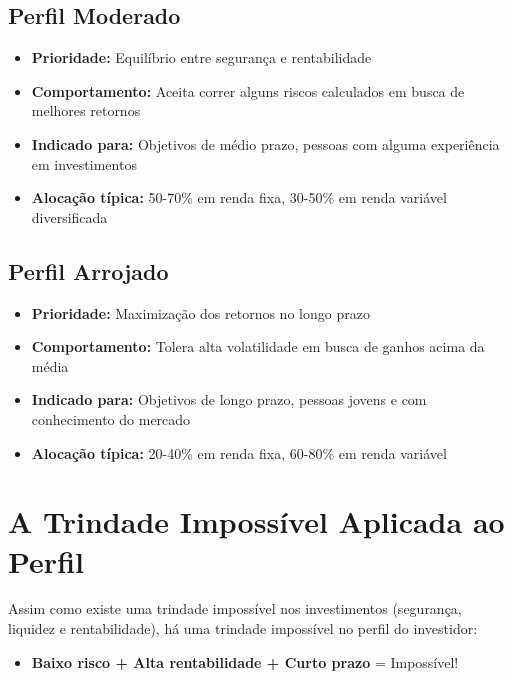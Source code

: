 \subsection{Perfil Moderado}
\begin{itemize}[leftmargin=*]
    \item \textbf{Prioridade:} Equilíbrio entre segurança e rentabilidade
    \item \textbf{Comportamento:} Aceita correr alguns riscos calculados em busca de melhores retornos
    \item \textbf{Indicado para:} Objetivos de médio prazo, pessoas com alguma experiência em investimentos
    \item \textbf{Alocação típica:} 50-70\% em renda fixa, 30-50\% em renda variável diversificada
\end{itemize}

\subsection{Perfil Arrojado}
\begin{itemize}[leftmargin=*]
    \item \textbf{Prioridade:} Maximização dos retornos no longo prazo
    \item \textbf{Comportamento:} Tolera alta volatilidade em busca de ganhos acima da média
    \item \textbf{Indicado para:} Objetivos de longo prazo, pessoas jovens e com conhecimento do mercado
    \item \textbf{Alocação típica:} 20-40\% em renda fixa, 60-80\% em renda variável
\end{itemize}

\section{A Trindade Impossível Aplicada ao Perfil}

\noindent Assim como existe uma trindade impossível nos investimentos (segurança, liquidez e rentabilidade), há uma trindade impossível no perfil do investidor:

\begin{itemize}[leftmargin=*]
    \item \textbf{Baixo risco + Alta rentabilidade + Curto prazo} = Impossível!
\end{itemize}

